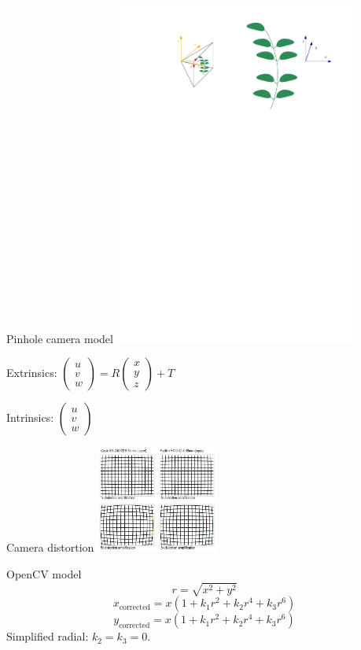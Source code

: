 \documentclass[aspectratio=169]{beamer}
\begin{document}
\begin{frame}{Pinhole camera model}
    \centering
    \includegraphics[width=0.6\textwidth]{images/reperes.pdf}

    Extrinsics: $\left( \begin{array}{c}
            u \\ v \\ w
            \end{array} \right)= R\left( \begin{array}{c}
            x \\ y \\ z
    \end{array} \right) + T$

    Intrinsics: $\left( \begin{array}{c}
            u \\ v \\ w
    \end{array} \right)$
\end{frame}
\begin{frame}{Camera distortion}
    \centering
    \includegraphics[width=0.3\textwidth]{images/qwe_download.png}
    \begin{block}{OpenCV model}
        \[
            r = \sqrt{x^2 + y^2}
        \]
        \[
            x_{\textrm{corrected}} = x(1+k_1r^2 + k_2r^4 + k_3r^6)
        \]
        \[
            y_{\textrm{corrected}} = x(1+k_1r^2 + k_2r^4 + k_3r^6)
        \]
        Simplified radial:
        $k_2 = k_3 = 0.$
    \end{block}

\end{frame}
\end{document}
